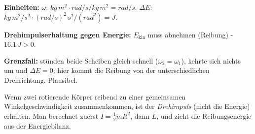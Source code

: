 \begin{kontrolle}
\textbf{Einheiten:} $\omega$: $kg\,m^2\cdot rad/s / kg\,m^2 = rad/s$. \checkmark
$\Delta E$: $kg\,m^2/s^2\cdot(rad/s)^2\,s^2/(rad^2)=J$. \checkmark

\textbf{Drehimpulserhaltung gegen Energie:} $E_\mathrm{kin}$ muss abnehmen
(Reibung) - $16.1\,\si{J}>0$. \checkmark

\textbf{Grenzfall:} stünden beide Scheiben gleich schnell ($\omega_2=\omega_1$),
kehrte sich nichts um und $\Delta E=0$; hier kommt die Reibung von der
unterschiedlichen Drehrichtung. Plausibel.
\end{kontrolle}

\begin{merksatz}
Wenn zwei rotierende Körper reibend zu einer gemeinsamen Winkelgeschwindigkeit
zusammenkommen, ist der \emph{Drehimpuls} (nicht die Energie) erhalten.
Man berechnet zuerst $I=\frac12 mR^2$, dann $L$, und zieht die
Reibungsenergie aus der Energiebilanz.
\end{merksatz}